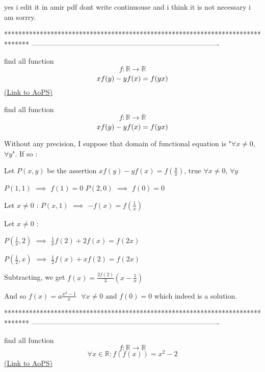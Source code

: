 \begin{solution}
	yes i edit it 
in amir pdf dont write continuouse and i think it is not necessary
i am sorrry.
\end{solution}
*******************************************************************************
-------------------------------------------------------------------------------

\begin{problem}
	find all function 
\[f:\mathbb{R}\rightarrow \mathbb{R}\]
\[xf(y)-yf(x)=f(y\/x)\]
	\flushright \href{https://artofproblemsolving.com/community/c6h570142}{(Link to AoPS)}
\end{problem}



\begin{solution}
	\begin{tcolorbox}find all function 
\[f:\mathbb{R}\rightarrow \mathbb{R}\]
\[xf(y)-yf(x)=f(y\/x)\]\end{tcolorbox}
Without any precision, I suppose that domain of functional equation is "$\forall x\ne 0$, $\forall y$". If so :

Let $P(x,y)$ be the assertion $xf(y)-yf(x)=f(\frac yx)$, true $\forall x\ne 0$, $\forall y$

$P(1,1)$ $\implies$ $f(1)=0$
$P(2,0)$ $\implies$ $f(0)=0$

Let $x\ne 0$ : $P(x,1)$ $\implies$ $-f(x)=f(\frac 1x)$

Let $x\ne 0$ :

$P(\frac 1x,2)$ $\implies$ $\frac 1xf(2)+2f(x)=f(2x)$

$P(\frac 12,x)$ $\implies$ $\frac 12f(x)+xf(2)=f(2x)$

Subtracting, we get $f(x)=\frac{2f(2)}3(x-\frac 1x)$

And so $\boxed{f(x)=a\frac{x^2-1}x\text{    }\forall x\ne 0\text{   and   }f(0)=0}$ which indeed is a solution.
\end{solution}
*******************************************************************************
-------------------------------------------------------------------------------

\begin{problem}
	find all function
\[f:\mathbb{R}\rightarrow \mathbb{R}\]
\[\forall x\in \mathbb{R}: f(f(x))=x^{2}-2\]
	\flushright \href{https://artofproblemsolving.com/community/c6h570148}{(Link to AoPS)}
\end{problem}



